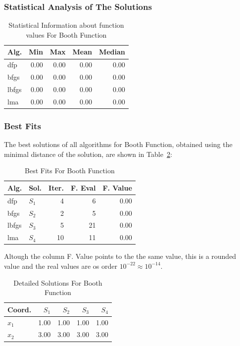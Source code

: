 \documentclass[conference]{IEEEtran}
\begin{document}
\subsubsection{Statistical Analysis of The Solutions}
\label{statisticalanalysisbooth2D}

\begin{table}[H]
\centering
\caption{Statistical Information about function values For Booth Function}
\label{function_values:booth}
\begin{tabular}{lrrrr}
\toprule
 Alg. &  Min &  Max &  Mean &  Median \\
\midrule
  dfp & 0.00 & 0.00 &  0.00 &    0.00 \\
 bfgs & 0.00 & 0.00 &  0.00 &    0.00 \\
lbfgs & 0.00 & 0.00 &  0.00 &    0.00 \\
  lma & 0.00 & 0.00 &  0.00 &    0.00 \\
\bottomrule
\end{tabular}
\end{table}

\subsubsection{Best Fits}
\label{bestfitsbooth2D}

The best solutions of all algorithms for Booth Function, obtained using the minimal
distance of the solution, are shown in Table~\ref{solutions:booth}:
\begin{table}[H]
\centering
\caption{Best Fits For Booth Function}
\label{solutions:booth}
\begin{tabular}{llrrr}
\toprule
 Alg. &    Sol. &  Iter. &  F. Eval &  F. Value \\
\midrule
  dfp & $S_{1}$ &      4 &        6 &      0.00 \\
 bfgs & $S_{2}$ &      2 &        5 &      0.00 \\
lbfgs & $S_{3}$ &      5 &       21 &      0.00 \\
  lma & $S_{4}$ &     10 &       11 &      0.00 \\
\bottomrule
\end{tabular}
\end{table}



Altough the column F. Value points to the the same value, this is a rounded value
and the real values are os order $10^{-22} \approx 10^{-14}$.

\begin{table}[H]
\centering
\caption{Detailed Solutions For Booth Function}
\label{detailedsolutions:booth}
\begin{tabular}{lrrrr}
\toprule
 Coord. &  $S_{1}$ &  $S_{2}$ &  $S_{3}$ &  $S_{4}$ \\
\midrule
$x_{1}$ &     1.00 &     1.00 &     1.00 &     1.00 \\
$x_{2}$ &     3.00 &     3.00 &     3.00 &     3.00 \\
\bottomrule
\end{tabular}
\end{table}
\end{document}
